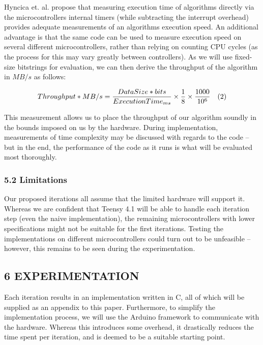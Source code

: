 Hyncica et. al. \cite{micromeasurements} propose that measuring execution time of algorithms directly via the microcontrollers internal timers (while subtracting the interrupt overhead) provides adequate measurements of an algorithms execution speed. An additional advantage is that the same code can be used to measure execution speed on several different microcontrollers, rather than relying on counting CPU cycles (as the process for this may vary greatly between controllers). As we will use fixed-size bitstrings for evaluation, we can then derive the throughput of the algorithm in \(MB/s\) as follows:

\[
Throughput*{MB/s} = \frac{DataSize*{bits}}{Execution Time_{ms}} \times
\frac{1}{8} \times \frac{1000}{10^6} \text{\phantom{12}(2)}
\]

This measurement allows us to place the throughput of our algorithm soundly in the bounds imposed on us by the hardware. During implementation, measurements of time complexity may be discussed with regards to the code -- but in the end, the performance of the code as it runs is what will be evaluated most thoroughly.

\subsubsection{5.2 Limitations}\label{limitations}

Our proposed iterations all assume that the limited hardware will support it. Whereas we are confident that Teensy 4.1 will be able to handle each iteration step (even the naive implementation), the remaining microcontrollers with lower specifications might not be suitable for the first iterations. Testing the implementations on different microcontrollers could turn out to be unfeasible -- however, this remains to be seen during the experimentation.

\subsection{6 EXPERIMENTATION}\label{experimentation}

Each iteration results in an implementation written in C, all of which will be supplied as an appendix to this paper. Furthermore, to simplify the implementation process, we will use the Arduino framework to communicate with the hardware. Whereas this introduces some overhead, it drastically reduces the time spent per iteration, and is deemed to be a suitable starting point.


